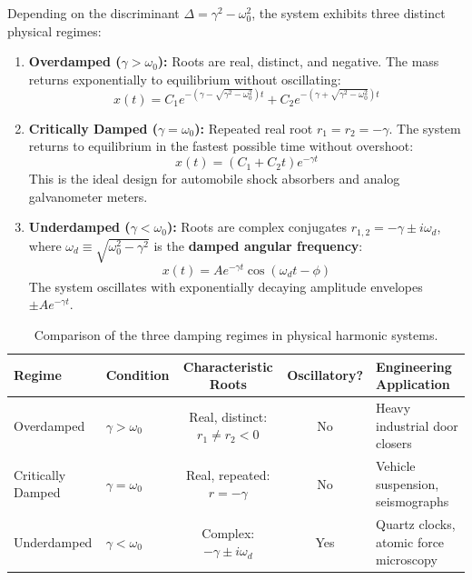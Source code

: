 Depending on the discriminant $\Delta = \gamma^2 - \omega_0^2$, the system exhibits three distinct physical regimes:
\begin{enumerate}
    \item \textbf{Overdamped ($\gamma > \omega_0$):} Roots are real, distinct, and negative. The mass returns exponentially to equilibrium without oscillating:
    \begin{equation}
    x(t) = C_1 e^{-(\gamma - \sqrt{\gamma^2 - \omega_0^2})t} + C_2 e^{-(\gamma + \sqrt{\gamma^2 - \omega_0^2})t}
    \end{equation}
    \item \textbf{Critically Damped ($\gamma = \omega_0$):} Repeated real root $r_1 = r_2 = -\gamma$. The system returns to equilibrium in the fastest possible time without overshoot:
    \begin{equation}
    x(t) = (C_1 + C_2 t)e^{-\gamma t}
    \end{equation}
    This is the ideal design for automobile shock absorbers and analog galvanometer meters.
    \item \textbf{Underdamped ($\gamma < \omega_0$):} Roots are complex conjugates $r_{1,2} = -\gamma \pm i\omega_d$, where $\omega_d \equiv \sqrt{\omega_0^2 - \gamma^2}$ is the \textbf{damped angular frequency}:
    \begin{equation}
    x(t) = A e^{-\gamma t}\cos(\omega_d t - \phi)
    \end{equation}
    The system oscillates with exponentially decaying amplitude envelopes $\pm A e^{-\gamma t}$.
\end{enumerate}

\begin{table}[H]
\centering
\small
\begin{tabularx}{\textwidth}{llccX}
\toprule
\textbf{Regime} & \textbf{Condition} & \textbf{Characteristic Roots} & \textbf{Oscillatory?} & \textbf{Engineering Application} \\
\midrule
Overdamped & $\gamma > \omega_0$ & Real, distinct: $r_1 \neq r_2 < 0$ & No & Heavy industrial door closers \\
Critically Damped & $\gamma = \omega_0$ & Real, repeated: $r = -\gamma$ & No & Vehicle suspension, seismographs \\
Underdamped & $\gamma < \omega_0$ & Complex: $-\gamma \pm i\omega_d$ & Yes & Quartz clocks, atomic force microscopy \\
\bottomrule
\end{tabularx}
\caption{Comparison of the three damping regimes in physical harmonic systems.}
\label{tab:ch09_damping_regimes}
\end{table}

